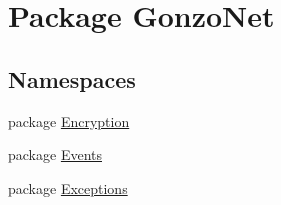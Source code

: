 \hypertarget{namespace_gonzo_net}{\section{Package Gonzo\+Net}
\label{namespace_gonzo_net}
}
\subsection*{Namespaces}
\begin{DoxyCompactItemize}
\item 
package \hyperlink{namespace_gonzo_net_1_1_encryption}{Encryption}
\item 
package \hyperlink{namespace_gonzo_net_1_1_events}{Events}
\item 
package \hyperlink{namespace_gonzo_net_1_1_exceptions}{Exceptions}
\end{DoxyCompactItemize}
